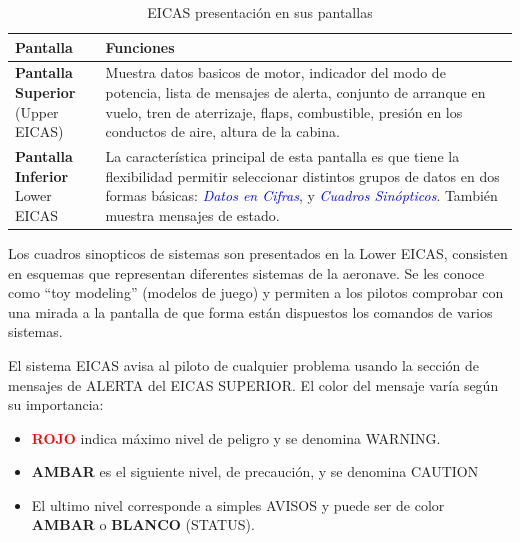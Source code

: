 \begin{table}[!h]\centering
\caption{EICAS presentaci\'on en sus pantallas}
\label{tab:01.eicas.presentacion.en.pantallas}
  
\begin{tabular}{m{0.3\textwidth}m{0.65\textwidth}} \hline {}
{\bf Pantalla} & {\bf Funciones } \\ \hline
\parbox{\linewidth}{  \textbf{Pantalla Superior} \\
(Upper EICAS)
}
& Muestra datos basicos de motor, indicador del modo de potencia, 
lista de mensajes de alerta, 
conjunto de arranque en vuelo, 
tren de aterrizaje, 
flaps,
combustible,
presi\'on en los conductos de aire,
altura de la cabina. \\ 

\parbox{\linewidth}{  \textbf{Pantalla Inferior} \\ Lower EICAS}
& 
La característica principal de esta
pantalla es que tiene la flexibilidad
permitir seleccionar distintos grupos
de datos en dos formas básicas:
\textcolor{blue}{\it Datos en Cifras}, y
\textcolor{blue}{\it Cuadros Sin\'opticos}.
Tambi\'en muestra mensajes de estado. \\ \hline
\end{tabular}
\end{table}


Los cuadros sinopticos de sistemas son presentados en la Lower EICAS, consisten en esquemas que representan diferentes sistemas de la aeronave.  Se les conoce como ``toy modeling'' (modelos de juego) y permiten a los pilotos comprobar con una mirada a la pantalla de que forma est\'an dispuestos los comandos de varios sistemas. 

El sistema EICAS avisa al piloto de cualquier
problema usando la sección de mensajes de
ALERTA del EICAS SUPERIOR.
El color del mensaje varía según su importancia:

\begin{itemize}
\item \textcolor{red}{\bf ROJO} indica máximo nivel de peligro y se   denomina WARNING.

\item \textcolor{amber}{\bf AMBAR} es el siguiente nivel, de   precaución, y se denomina CAUTION

\item El ultimo nivel corresponde a simples AVISOS y puede ser de   color \textcolor{amber}{\bf AMBAR} o {\bf BLANCO} (STATUS).
\end{itemize}

